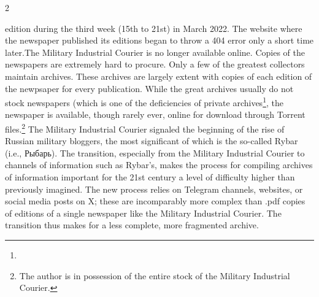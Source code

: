 \documentclass[10pt,a4paper,twoside]{article} %
\begin{document}
\begin{multicols}{2}
{{edition during the third week (15th to 21st) in March 2022. The website where the newspaper published its editions began to throw a 404 error only a short time later.The Military Industrial Courier is no longer available online. Copies of the newspapers are extremely hard to procure. Only a few of the greatest collectors maintain archives. These archives are largely extent with copies of each edition of the newpsaper for every publication. While the great archives usually do not stock newspapers (which is one of the deficiencies of private archives\footnote{}, the newspaper is available, though rarely ever, online for download through Torrent files.\footnote{The author is in possession of the entire stock of the Military Industrial Courier.} \newline \indent The Military Industrial Courier signaled the beginning of the rise of Russian military bloggers, the most significant of which is the so-called Rybar (i.e., \textrussian{Рыбарь}). The transition, especially from the Military Industrial Courier to channels of information such as Rybar's, makes the process for compiling archives of information important for the 21st century a level of difficulty higher than previously imagined. The new process relies on Telegram channels, websites, or social media posts on X; these are incomparably more complex than .pdf copies of editions of a single newspaper like the Military Industrial Courier. The transition thus makes for a less complete, more fragmented archive. 
}

}
\end{multicols}
\end{document}
